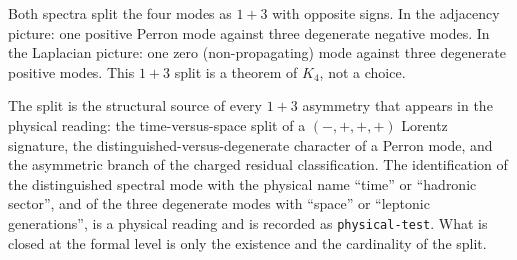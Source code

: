 \documentclass[11pt]{article}
\begin{document}
Both spectra split the four modes as $1+3$ with opposite signs.  In
the adjacency picture: one positive Perron mode against three
degenerate negative modes.  In the Laplacian picture: one zero
(non-propagating) mode against three degenerate positive modes.  This
$1+3$ split is a theorem of $K_4$, not a choice.

The split is the structural source of every $1+3$ asymmetry that
appears in the physical reading: the time-versus-space split of a
$(-,+,+,+)$ Lorentz signature, the distinguished-versus-degenerate
character of a Perron mode, and the asymmetric branch of the charged
residual classification.  The identification of the distinguished
spectral mode with the physical name ``time'' or ``hadronic sector'',
and of the three degenerate modes with ``space'' or ``leptonic
generations'', is a physical reading and is recorded as
\texttt{physical-test}.  What is closed at the formal level is only
the existence and the cardinality of the split.
\end{document}
